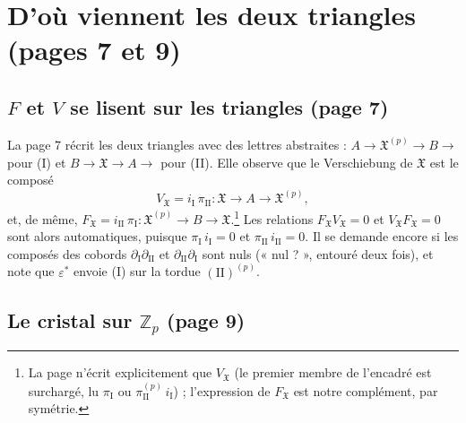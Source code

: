 \documentclass[11pt,a4paper]{article}
\begin{document}
\section*{D'où viennent les deux triangles (pages 7 et 9)}

\subsection*{$F$ et $V$ se lisent sur les triangles (page 7)}

La page 7 récrit les deux triangles avec des lettres abstraites :
$A \to \mathfrak{X}^{(p)} \to B \to$ pour (I) et $B \to \mathfrak{X} \to A
\to$ pour (II). Elle observe que le Verschiebung de $\mathfrak{X}$ est le
composé
\[
V_{\mathfrak{X}} = i_{\mathrm{I}}\,\pi_{\mathrm{II}}\colon
\mathfrak{X} \to A \to \mathfrak{X}^{(p)},
\]
et, de même, $F_{\mathfrak{X}} = i_{\mathrm{II}}\,\pi_{\mathrm{I}}\colon
\mathfrak{X}^{(p)} \to B \to \mathfrak{X}$.\footnote{La page n'écrit
explicitement que $V_{\mathfrak{X}}$ (le premier membre de l'encadré est
surchargé, lu $\pi_{\mathrm{I}}$ ou $\pi^{(p)}_{\mathrm{II}}\,i_{\mathrm{I}}$) ;
l'expression de $F_{\mathfrak{X}}$ est notre complément, par symétrie.} Les
relations $F_{\mathfrak{X}}V_{\mathfrak{X}} = 0$ et
$V_{\mathfrak{X}}F_{\mathfrak{X}} = 0$ sont alors automatiques, puisque
$\pi_{\mathrm{I}}\,i_{\mathrm{I}} = 0$ et $\pi_{\mathrm{II}}\,i_{\mathrm{II}} = 0$.
Il se demande encore si les composés des cobords
$\partial_{\mathrm{I}}\partial_{\mathrm{II}}$ et
$\partial_{\mathrm{II}}\partial_{\mathrm{I}}$ sont nuls (« nul ? », entouré
deux fois), et note que $\varepsilon^{*}$ envoie (I) sur la tordue
$(\mathrm{II})^{(p)}$.

\subsection*{Le cristal sur $\mathbb{Z}_{p}$ (page 9)}
\end{document}
